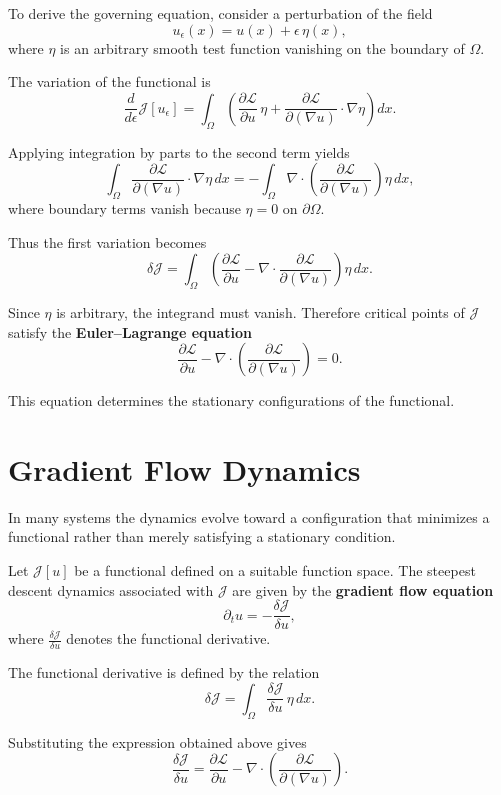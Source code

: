 \documentclass[11pt, openany]{book}
\theoremstyle{plain}
\theoremstyle{definition}
\theoremstyle{remark}
\begin{document}
To derive the governing equation, consider a perturbation of the field
\[
u_\epsilon(x)=u(x)+\epsilon\,\eta(x),
\]
where $\eta$ is an arbitrary smooth test function vanishing on the
boundary of $\Omega$.

The variation of the functional is
\[
\frac{d}{d\epsilon}\mathcal{J}[u_\epsilon]
=
\int_\Omega
\left(
\frac{\partial\mathcal{L}}{\partial u}\,\eta
+
\frac{\partial\mathcal{L}}{\partial(\nabla u)}
\cdot
\nabla\eta
\right)dx.
\]

Applying integration by parts to the second term yields
\[
\int_\Omega
\frac{\partial\mathcal{L}}{\partial(\nabla u)}\cdot\nabla\eta\,dx
=
-
\int_\Omega
\nabla\cdot
\left(
\frac{\partial\mathcal{L}}{\partial(\nabla u)}
\right)
\eta\,dx,
\]
where boundary terms vanish because $\eta=0$ on $\partial\Omega$.

Thus the first variation becomes
\[
\delta\mathcal{J}
=
\int_\Omega
\left(
\frac{\partial\mathcal{L}}{\partial u}
-
\nabla\cdot
\frac{\partial\mathcal{L}}{\partial(\nabla u)}
\right)
\eta\,dx.
\]

Since $\eta$ is arbitrary, the integrand must vanish.  Therefore
critical points of $\mathcal{J}$ satisfy the
\textbf{Euler--Lagrange equation}
\[
\frac{\partial\mathcal{L}}{\partial u}
-
\nabla\cdot
\left(
\frac{\partial\mathcal{L}}{\partial(\nabla u)}
\right)
=0.
\]

This equation determines the stationary configurations of the
functional.

\section{Gradient Flow Dynamics}

In many systems the dynamics evolve toward a configuration that
minimizes a functional rather than merely satisfying a stationary
condition.

Let $\mathcal{J}[u]$ be a functional defined on a suitable function
space.  The steepest descent dynamics associated with $\mathcal{J}$ are
given by the \textbf{gradient flow equation}
\[
\partial_t u
=
-\frac{\delta\mathcal{J}}{\delta u},
\]
where $\frac{\delta\mathcal{J}}{\delta u}$ denotes the functional
derivative.

The functional derivative is defined by the relation
\[
\delta\mathcal{J}
=
\int_\Omega
\frac{\delta\mathcal{J}}{\delta u}\,
\eta\,dx.
\]

Substituting the expression obtained above gives
\[
\frac{\delta\mathcal{J}}{\delta u}
=
\frac{\partial\mathcal{L}}{\partial u}
-
\nabla\cdot
\left(
\frac{\partial\mathcal{L}}{\partial(\nabla u)}
\right).
\]
\end{document}
